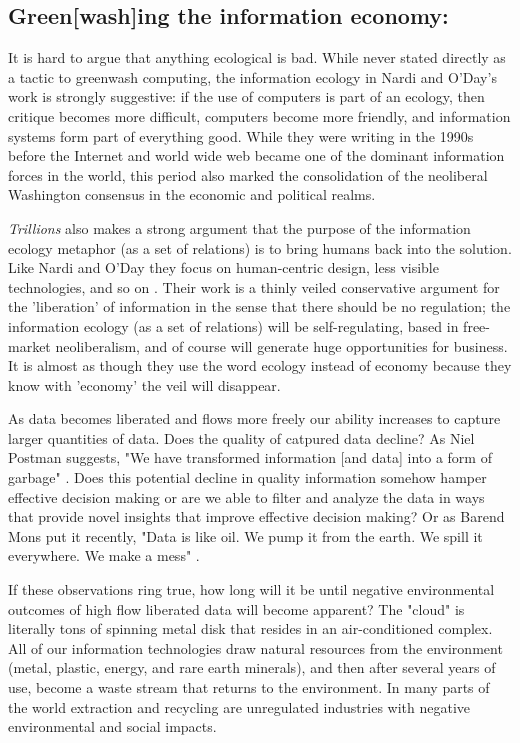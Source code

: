 \subsection{Green[wash]ing the information economy:}

It is hard to argue that anything ecological is bad. While never stated directly as a tactic to greenwash computing, the information ecology in Nardi and O'Day's work is strongly suggestive: if the use of computers is part of an ecology, then critique becomes more difficult, computers become more friendly, and information systems form part of everything good. While they were writing in the 1990s before the Internet and world wide web became one of the dominant information forces in the world, this period also marked the consolidation of the neoliberal Washington consensus in the economic and political realms.

\textit{Trillions} also makes a strong argument that the purpose of the information ecology metaphor (as a set of relations) is to bring humans back into the solution. Like Nardi and O'Day they focus on human-centric design, less visible technologies, and so on \citep{lucas_2012}. Their work is a thinly veiled conservative argument for the 'liberation' of information in the sense that there should be no regulation; the information ecology (as a set of relations) will be self-regulating, based in free-market neoliberalism, and of course will generate huge opportunities for business. It is almost as though they use the word ecology instead of economy because they know with 'economy' the veil will disappear.

As data becomes liberated and flows more freely our ability increases to capture larger quantities of data. Does the quality of catpured data decline? As Niel Postman suggests, "We have transformed information [and data] into a form of garbage" \citep[cited in][p. 50]{stepp_1999}. Does this potential decline in quality information somehow hamper effective decision making or are we able to filter and analyze the data in ways that provide novel insights that improve effective decision making? Or as Barend Mons put it recently, "Data is like oil. We pump it from the earth. We spill it everywhere. We make a mess" \citep{mons_2016}. 

If these observations ring true, how long will it be until negative environmental outcomes of high flow liberated data will become apparent? The "cloud" is literally tons of spinning metal disk that resides in an air-conditioned complex. All of our information technologies draw natural resources from the environment (metal, plastic, energy, and rare earth minerals), and then after several years of use, become a waste stream that returns to the environment. In many parts of the world extraction and recycling are unregulated industries with negative environmental and social impacts.

